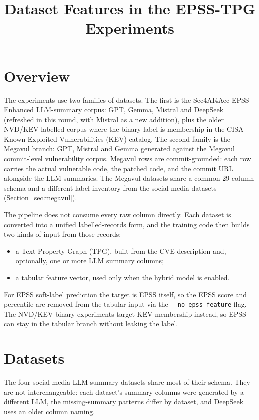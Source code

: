 \documentclass[11pt]{article}
\title{Dataset Features in the EPSS-TPG Experiments}
\author{}
\date{}
\begin{document}
\maketitle

\section{Overview}

The experiments use two families of datasets. The first is the
Sec4AI4Aec-EPSS-Enhanced LLM-summary corpus: GPT, Gemma, Mistral and
DeepSeek (refreshed in this round, with Mistral as a new addition),
plus the older NVD/KEV labelled corpus where the binary label is
membership in the CISA Known Exploited Vulnerabilities (KEV) catalog.
The second family is the Megavul branch: GPT, Mistral and Gemma
generated against the Megavul commit-level vulnerability corpus.
Megavul rows are commit-grounded: each row carries the actual
vulnerable code, the patched code, and the commit URL alongside the
LLM summaries. The Megavul datasets share a common 29-column schema
and a different label inventory from the social-media datasets
(Section~\ref{sec:megavul}).

The pipeline does not consume every raw column directly. Each dataset
is converted into a unified labelled-records form, and the training
code then builds two kinds of input from those records:

\begin{itemize}
    \item a Text Property Graph (TPG), built from the CVE description
    and, optionally, one or more LLM summary columns;
    \item a tabular feature vector, used only when the hybrid model is
    enabled.
\end{itemize}

For EPSS soft-label prediction the target is EPSS itself, so the EPSS
score and percentile are removed from the tabular input via the
\verb|--no-epss-feature| flag. The NVD/KEV binary experiments target
KEV membership instead, so EPSS can stay in the tabular branch
without leaking the label.

\section{Datasets}

The four social-media LLM-summary datasets share most of their schema.
They are not interchangeable: each dataset's summary columns were
generated by a different LLM, the missing-summary patterns differ by
dataset, and DeepSeek uses an older column naming.
\end{document}
